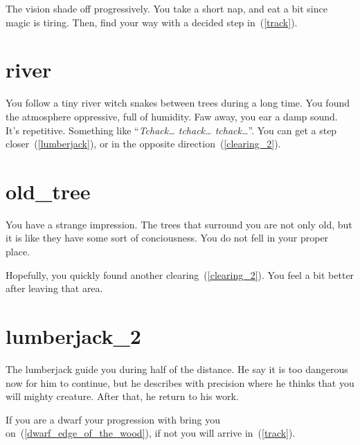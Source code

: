 The vision shade off progressively. You take a short nap, and eat a bit
since magic is tiring. Then, find your way with a decided step in~(\ref{track}).

\section{river}

You follow a tiny river witch snakes between trees during a long time. You found
the atmosphere oppressive, full of humidity. Faw away, you ear a damp sound.
It's repetitive. Something like ``\textit{Tchack… tchack… tchack…}''. You can
get a step closer~(\ref{lumberjack}), or in the opposite
direction~(\ref{clearing_2}).

\section{old_tree}

You have a strange impression. The trees that surround you are not only old, but
it is like they have some sort of conciousness. You do not fell in your proper
place.

Hopefully, you quickly found another clearing~(\ref{clearing_2}). You feel a bit
better after leaving that area.

\section{lumberjack_2}

The lumberjack guide you during half of the distance. He say it is too dangerous
now for him to continue, but he describes with precision where he thinks that you
will mighty creature. After that, he return to his work.

If you are a dwarf your progression with bring you
on~(\ref{dwarf_edge_of_the_wood}), if not you will arrive in~(\ref{track}).
